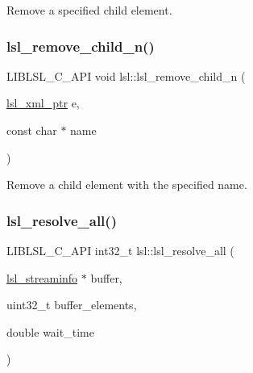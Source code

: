 Remove a specified child element. \mbox{\label{namespacelsl_a1a946a99964cbd500165fbd5f3d33766}} 
\subsubsection{\texorpdfstring{lsl\+\_\+remove\+\_\+child\+\_\+n()}{lsl\_remove\_child\_n()}}
{\footnotesize\ttfamily L\+I\+B\+L\+S\+L\+\_\+\+C\+\_\+\+A\+PI void lsl\+::lsl\+\_\+remove\+\_\+child\+\_\+n (\begin{DoxyParamCaption}\item[{\hyperlink{namespacelsl_a5edc7a49a1a1be1634fe6dce3d59c59b}{lsl\+\_\+xml\+\_\+ptr}}]{e,  }\item[{const char $\ast$}]{name }\end{DoxyParamCaption})}

Remove a child element with the specified name. \mbox{\label{namespacelsl_a075ab08464c90d97b8f081d89ea889f2}} 
\subsubsection{\texorpdfstring{lsl\+\_\+resolve\+\_\+all()}{lsl\_resolve\_all()}}
{\footnotesize\ttfamily L\+I\+B\+L\+S\+L\+\_\+\+C\+\_\+\+A\+PI int32\+\_\+t lsl\+::lsl\+\_\+resolve\+\_\+all (\begin{DoxyParamCaption}\item[{\hyperlink{namespacelsl_aa0a9ce9956061679949daa2e35aae2e8}{lsl\+\_\+streaminfo} $\ast$}]{buffer,  }\item[{uint32\+\_\+t}]{buffer\+\_\+elements,  }\item[{double}]{wait\+\_\+time }\end{DoxyParamCaption})}

